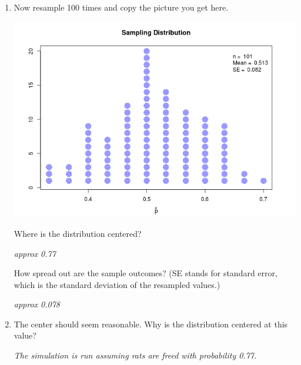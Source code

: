 \begin{enumerate}
\begin{key}
{\it  AWV}
\end{key}

 \item Now resample 100 times and copy the picture you get here.
\begin{students}
  \vspace{4cm}
\end{students}

\begin{key}
  \includegraphics[width=.5\linewidth]{../plots/freeRats-101resamples.png}
\end{key} 

   Where is the distribution centered?
\begin{students}
  \vspace{.6cm}
\end{students}

\begin{key}
{\it  approx 0.77}
\end{key}

   How spread out are the sample outcomes? (SE stands for  standard
    error, which is the standard deviation of the resampled values.)
\begin{students}
  \vspace{.6cm}
\end{students}

\begin{key}
{\it  approx 0.078}
\end{key}

 \item The center should seem reasonable.  Why is the distribution
   centered at this value?
\begin{students}
  \vspace{1cm}
\end{students}

\begin{key}
{\it  The simulation is run assuming rats are freed with probability 0.77.}
\end{key}



\end{enumerate}
